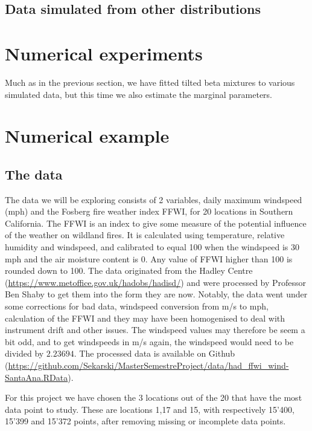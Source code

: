 \documentclass[10pt]{report}
\begin{document}
\subsection{Data simulated from other distributions}
\label{sec:wrongdist}

\section{Numerical experiments}
Much as in the previous section, we have fitted tilted beta mixtures to various simulated data, but this time we also estimate the marginal parameters.

\section{Numerical example}

\subsection{The data}
The data we will be exploring consists of 2 variables, daily maximum windspeed (mph) and the Fosberg fire weather index FFWI, for 20 locations in Southern California. The FFWI is an index to give some measure of the potential influence of the weather on wildland fires. It is calculated using temperature, relative humidity and windspeed, and calibrated to equal 100 when the windspeed is 30 mph and the air moisture content is 0. Any value of FFWI higher than 100 is rounded down to 100.
The data originated from the Hadley Centre (\url{https://www.metoffice.gov.uk/hadobs/hadisd/}) and were processed by Professor Ben Shaby to get them into the form they are now. Notably, the data went under some corrections for bad data, windspeed conversion from m/s to mph, calculation of the FFWI and they may have been homogenised to deal with instrument drift and other issues. The windspeed values may therefore be seem a bit odd, and to get windspeeds in m/s again, the windspeed would need to be divided by $2.23694$.
The processed data is available on Github (\url{https://github.com/Sekarski/MasterSemestreProject/data/had_ffwi_wind-SantaAna.RData}).

For this project we have chosen the 3 locations out of the 20 that have the most data point to study. These are locations 1,17 and 15, with respectively 15'400, 15'399 and 15'372 points, after removing missing or incomplete data points.
\end{document}
